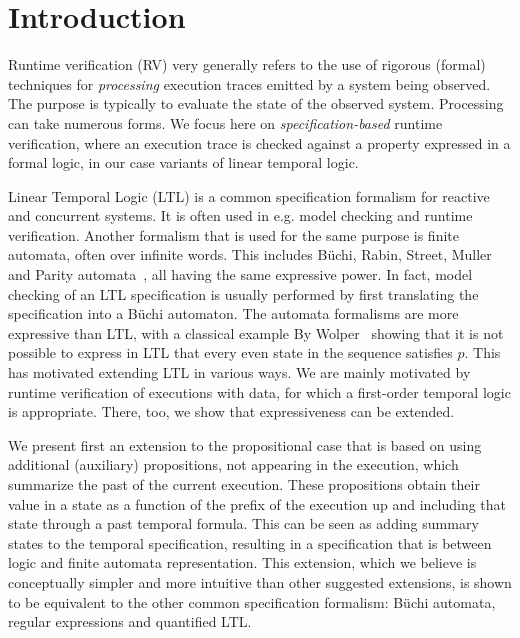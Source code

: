 \section{Introduction}

Runtime verification (RV)  \cite{bartocci18,havelund-rv-data-2018} very generally refers to the use of rigorous (formal) 
techniques for {\em processing} execution traces emitted by a system being observed. The purpose is typically
to evaluate the state of the observed system. Processing can take numerous
forms. We focus here on {\em specification-based} runtime verification, where an execution trace is checked against a property expressed in a formal logic, in our case variants of linear temporal logic.

Linear Temporal Logic (LTL) is a common specification formalism for reactive and concurrent systems. It is often used in e.g. model checking and runtime verification. Another formalism that is used for the same purpose is finite automata, often over infinite words. This includes B\"{u}chi, Rabin, Street, Muller and Parity automata~\cite{Thomas}, all having the same expressive power. In fact, model checking of an LTL specification
is usually performed by first translating the specification into a B\"{u}chi automaton. The automata formalisms are more expressive than LTL, with a classical example By Wolper~\cite{Wolper} showing that
it is not possible to express in LTL that every even state in
the sequence satisfies $p$. This has motivated extending LTL
in various ways.
We are mainly motivated by runtime verification of executions with data, for which a first-order temporal logic is
appropriate. There, too, we show that expressiveness can be extended.

We present first an extension to the propositional case that is based on using additional (auxiliary) propositions, not appearing in the execution, which summarize the past 
of the current execution. These propositions obtain their value in a state as a function of the prefix of the execution up and including that state through a past temporal formula. This can be seen as adding
summary states to the temporal specification, resulting in a specification that is between logic and finite automata representation. This extension, which we believe is conceptually simpler
and more intuitive than other suggested extensions, is shown to be
equivalent to the other common specification formalism:
B\"{u}chi automata, regular expressions and quantified LTL.

